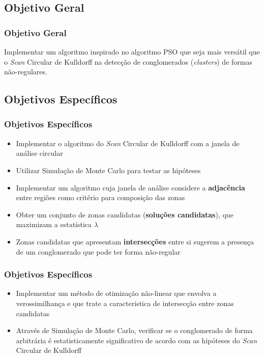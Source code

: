 \documentclass[aspectratio=169]{beamer}
\begin{document}
\subsection{Objetivo Geral}

\begin{frame}
\frametitle{Objetivo Geral}
Implementar um algoritmo inspirado no algoritmo PSO que seja mais versátil que o \textit{Scan} Circular de Kulldorff na detecção de conglomerados (\textit{clusters}) de formas não-regulares.
\end{frame}

\subsection{Objetivos Específicos}
\begin{frame}
\frametitle{Objetivos Específicos}
\begin{itemize}
\item Implementar o algoritmo do \textit{Scan} Circular de Kulldorff com a janela de análise circular
\item Utilizar Simulação de Monte Carlo para testar as hipóteses
\item Implementar um algoritmo cuja janela de análise considere a \textbf{adjacência} entre regiões como critério para composição das zonas
\item Obter um conjunto de zonas candidatas (\textbf{soluções candidatas}), que maximizam a estatística $\lambda$
\item Zonas candidatas que apresentam \textbf{intersecções} entre si sugerem a presença de um conglomerado que pode ter forma não-regular

\end{itemize}
\end{frame}



\begin{frame}
\frametitle{Objetivos Específicos}
\begin{itemize}

\item Implementar um método de otimização não-linear que envolva a verossimilhança e que trate a característica de intersecção entre zonas candidatas
\item Através de Simulação de Monte Carlo, verificar se o conglomerado de forma arbitrária é estatisticamente significativo de acordo com as hipóteses do \textit{Scan} Circular de Kulldorff
\end{itemize}
\end{frame}
\end{document}
